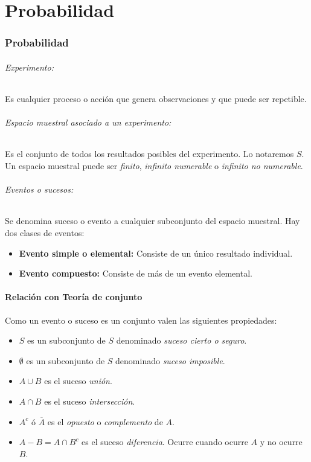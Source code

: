 \part{Probabilidad}
\section{Probabilidad}

\paragraph{Experimento:} Es cualquier proceso o acción que genera observaciones y que puede ser repetible.

\paragraph{Espacio muestral asociado a un experimento:} Es el conjunto de todos los resultados posibles del experimento. Lo notaremos $S$. Un espacio muestral puede ser \textit{finito}, \textit{infinito numerable} o \textit{infinito no numerable}.

\paragraph{Eventos o sucesos:} Se denomina suceso o evento a cualquier subconjunto del espacio muestral. Hay dos clases de eventos:
\begin{itemize}
\item \textbf{Evento simple o elemental:} Consiste de un único resultado individual.
\item \textbf{Evento compuesto:} Consiste de más de un evento elemental.
\end{itemize}
\subsection{Relación con Teoría de conjunto} Como un evento o suceso es un conjunto valen las siguientes propiedades:
\begin{itemize}
\item $S$ es un subconjunto de $S$ denominado \textit{suceso cierto o seguro}.
\item $\emptyset$ es un subconjunto de $S$ denominado \textit{suceso imposible}.
\item $A\cup B$ es el suceso \textit{unión}.
\item $A\cap B$ es el suceso \textit{intersección}.
\item $A^c$ ó $\overline{A}$ es el \textit{opuesto} o \textit{complemento} de $A$.
\item $A-B = A\cap B^c$ es el suceso \textit{diferencia}. Ocurre cuando ocurre $A$ y no ocurre $B$.
\end{itemize}

